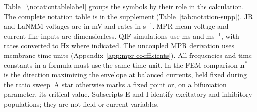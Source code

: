 \ifappendices
Table~\ref{\notationtablelabel} groups the symbols by their role in the calculation.
\else
The complete notation table is in the supplement (Table~\ref{tab:notation-supp}).
\fi
JR and LaNMM voltages are in mV and rates in s$^{-1}$. MPR mean voltage and current-like inputs are dimensionless.
QIF simulations use ms and ms$^{-1}$, with rates converted to Hz where indicated.
The uncoupled MPR derivation uses membrane-time units (Appendix~\ref{app:mpr-coefficients}).
All frequencies and time constants in a formula must use the same time unit. In the FEM comparison $\mathbf n^*$ is the direction maximizing the envelope
at balanced currents, held fixed during the ratio sweep. A star otherwise marks a fixed point or,
on a bifurcation parameter, its critical value. Subscripts E and I identify
excitatory and inhibitory populations; they are not field or current variables.

